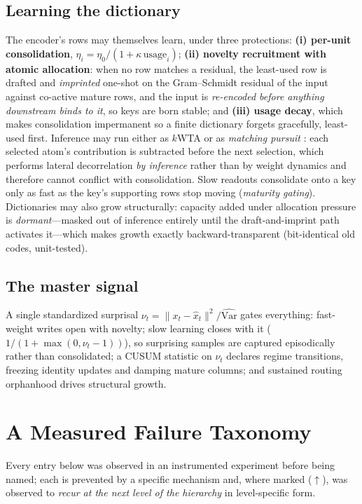 \documentclass[11pt]{article}
\begin{document}
\subsection{Learning the dictionary}
The encoder's rows may themselves learn, under three protections:
\textbf{(i) per-unit consolidation}, $\eta_i = \eta_0 / (1 + \kappa\,
\mathrm{usage}_i)$; \textbf{(ii) novelty recruitment with atomic
allocation}: when no row matches a residual, the least-used row is drafted
and \emph{imprinted} one-shot on the Gram--Schmidt residual of the input
against co-active mature rows, and the input is \emph{re-encoded before
anything downstream binds to it}, so keys are born stable; and
\textbf{(iii) usage decay}, which makes consolidation impermanent so a
finite dictionary forgets gracefully, least-used first. Inference may run
either as $k$WTA or as \emph{matching pursuit} \cite{mallat1993}: each
selected atom's contribution is subtracted before the next selection, which
performs lateral decorrelation \emph{by inference} rather than by weight
dynamics and therefore cannot conflict with consolidation. Slow readouts
consolidate onto a key only as fast as the key's supporting rows stop
moving (\emph{maturity gating}). Dictionaries may also grow structurally:
capacity added under allocation pressure is \emph{dormant}---masked out of
inference entirely until the draft-and-imprint path activates it---which
makes growth exactly backward-transparent (bit-identical old codes,
unit-tested).

\subsection{The master signal}
A single standardized surprisal $\nu_t = \|x_t - \hat{x}_t\|^2 /
\widehat{\mathrm{Var}}$ gates everything: fast-weight writes open with
novelty; slow learning closes with it ($1/(1+\max(0,\nu_t-1))$), so
surprising samples are captured episodically rather than consolidated;
a CUSUM statistic on $\nu_t$ declares regime transitions, freezing identity
updates and damping mature columns; and sustained routing orphanhood drives
structural growth.

\section{A Measured Failure Taxonomy}
\label{sec:taxonomy}

Every entry below was observed in an instrumented experiment before being
named; each is prevented by a specific mechanism and, where marked
($\uparrow$), was observed to \emph{recur at the next level of the
hierarchy} in level-specific form.
\end{document}
